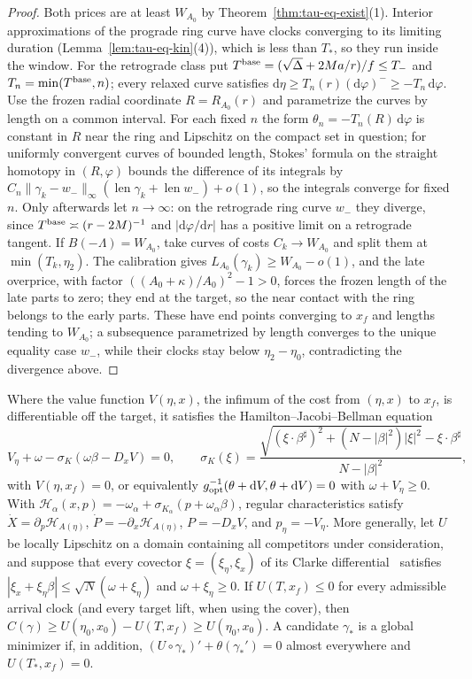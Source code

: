 \documentclass[aip,jmp,amsmath,amssymb,reprint]{revtex4-2}
\newcommand{\dd}{\mathrm{d}}
\newcommand{\gopt}{g_{\rm opt}}
\theoremstyle{plain}
\theoremstyle{definition}
\begin{document}
\begin{proof}
Both prices are at least $W_{A_0}$ by Theorem~\ref{thm:tau-eq-exist}(1). Interior approximations of
the prograde ring curve have clocks converging to its limiting duration
(Lemma~\ref{lem:tau-eq-kin}(4)), which is less than $T_*$, so they run inside the window. For the
retrograde class put $T^{\rm base}=(\sqrt\Delta+2Ma/r)/f\le T_-$ and $T_n=\min(T^{\rm base},n)$; every relaxed
curve satisfies $\dd\eta\ge T_n(r)(\dd\varphi)^-\ge-T_n\,\dd\varphi$. Use the frozen radial coordinate $R=R_{A_0}(r)$
and parametrize the curves by length on a common interval. For each fixed $n$ the form
$\theta_n=-T_n(R)\,\dd\varphi$ is constant in $R$ near the ring and Lipschitz on the compact set in question;
for uniformly convergent curves of bounded length, Stokes' formula on the straight homotopy in
$(R,\varphi)$ bounds the difference of its integrals by
$C_n\|\gamma_k-w_-\|_\infty(\operatorname{len}\gamma_k+\operatorname{len}w_-)+o(1)$, so the integrals converge for fixed
$n$. Only afterwards let $n\to\infty$: on the retrograde ring curve $w_-$ they diverge, since
$T^{\rm base}\asymp(r-2M)^{-1}$ and $|\dd\varphi/\dd r|$ has a positive limit on a retrograde tangent. If
$B(-\Lambda)=W_{A_0}$, take curves of costs $C_k\to W_{A_0}$ and split them at $\min(T_k,\eta_2)$. The calibration gives
$L_{A_0}(\gamma_k)\ge W_{A_0}-o(1)$, and the late overprice, with factor $((A_0+\kappa)/A_0)^2-1>0$, forces the
frozen length of the late parts to zero; they end at the target, so the near contact with the ring
belongs to the early parts. These have end points converging to $x_f$ and lengths tending to
$W_{A_0}$; a subsequence parametrized by length converges to the unique equality case $w_-$, while
their clocks stay below $\eta_2-\eta_0$, contradicting the divergence above.
\end{proof}

Where the value function $V(\eta,x)$, the infimum of the cost from $(\eta,x)$ to $x_f$, is
differentiable off the target, it satisfies the Hamilton--Jacobi--Bellman equation
\begin{equation}
  V_\eta+\omega-\sigma_K(\omega\beta-D_xV)=0,\qquad
  \sigma_K(\xi)=\frac{\sqrt{(\xi\cdot\beta^\sharp)^2+(N-|\beta|^2)|\xi|^2}-\xi\cdot\beta^\sharp}{N-|\beta|^2},
  \label{eq:tau-eq-hjb}
\end{equation}
with $V(\eta,x_f)=0$, or equivalently $\gopt^{-1}(\theta+\dd V,\theta+\dd V)=0$ with
$\omega+V_\eta\ge0$. With $\mathcal H_\alpha(x,p)=-\omega_\alpha+\sigma_{K_\alpha}(p+\omega_\alpha\beta)$, regular
characteristics satisfy $\dot X=\partial_p\mathcal H_{A(\eta)}$, $\dot P=-\partial_x\mathcal H_{A(\eta)}$, $P=-D_xV$, and
$p_\eta=-V_\eta$. More generally, let $U$ be locally Lipschitz on a domain containing all competitors
under consideration, and suppose that every covector $\xi=(\xi_\eta,\xi_x)$ of its Clarke
differential~\cite[section~4.7]{Vinter2000} satisfies $|\xi_x+\xi_\eta\beta|\le\sqrt N(\omega+\xi_\eta)$ and $\omega+\xi_\eta\ge0$. If $U(T,x_f)\le0$ for every
admissible arrival clock (and every target lift, when using the cover), then
$C(\gamma)\ge U(\eta_0,x_0)-U(T,x_f)\ge U(\eta_0,x_0)$. A candidate $\gamma_*$ is a global minimizer if, in
addition, $(U\circ\gamma_*)'+\theta(\gamma_*')=0$ almost everywhere and $U(T_*,x_f)=0$.
\end{document}
